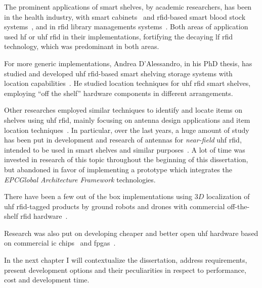 The prominent applications of smart shelves, by academic researchers, has been in the health industry, with smart cabinets~\cite{shiehUsingRFIDTechnology2008, dalessandroRFIDBasedSmartShelving2012, medeirosUHFRFIDCabinet2011, gomesIntelligentMedicineCabinet2013} and \ac{rfid}-based smart blood stock systems~\cite{zaricRFIDbasedSmartBlood2015}, and in \ac{rfid} library managements systems~\cite{markakisRFIDenabledLibraryManagement2013, markakisSafeEfficientDesign2014, ahmadtarmizibinabdullahLibraryShelfManagement2011, nishiyamaSmartShelfEfficient2012}.
Both areas of application used \acs{hf} or \acs{uhf} \ac{rfid} in their implementations, fortifying the decaying \ac{lf} \ac{rfid} technology, which was predominant in both areas.

For more generic implementations, Andrea D’Alessandro, in his PhD thesis, has studied and developed \ac{uhf} \ac{rfid}-based smart shelving storage systems with location capabilities~\cite{dalessandroRFIDBasedSmartShelving2012}.
He studied location techniques for \ac{uhf} \ac{rfid} smart shelves, employing ``off the shelf'' hardware components in different arrangements.

Other researches employed similar techniques to identify and locate items on shelves using \ac{uhf} \ac{rfid}, mainly focusing on antenna design applications and item location techniques~\cite{choiPassiveUHFRFIDBased2012, nikitinTheoryMeasurementBackscattering2007, medeirosUHFRFIDReader, yuanUHFRFIDShelf2012a}. 
In particular, over the last years, a huge amount of study has been put in development and research of antennas for \emph{near-field} \ac{uhf} \ac{rfid}, intended to be used in smart shelves and similar purposes~\cite{yuanUHFRFIDShelf2012a, liCIRCULARLYPOLARIZEDCOMPACT2013, casoModularAntennaUHF2014, ankangrenNovelDesignUHF2010, michelScalableModularAntenna2015, michelOverviewModularAntennas2016, michelDesignPerformanceAnalysis2012, parthibanLowcostScalableUHF2016, andrenkoNovelDesignUHF2013, choPlanarNearFieldRFID2011, tolinPolarizationReconfigurablePatch2019, parthibanScalableNearfieldFed2019, chenDesignSimulationUHF2018, choiUshapedSlotarrayAntenna2011, liUHFRFIDShelf2017, yuanUHFRFIDShelf2012, manziUseTransmissionLines2012, catarinucciImprovingItemlevelTracing2010, guDesignNearFieldRFID2019}.
A lot of time was invested in research of this topic throughout the beginning of this dissertation, but abandoned in favor of implementing a prototype which integrates the \emph{EPCGlobal Architecture Framework} technologies.

There have been a few out of the box implementations using $3D$ localization of \ac{uhf} \ac{rfid}-tagged products by ground robots and drones with commercial off-the-shelf \ac{rfid} hardware~\cite{tzitzisRealtime3DLocalization2020}.

Research was also put on developing cheaper and better open \ac{uhf} hardware based on commercial \ac{ic} chips~\cite{tangDesignUHFRFID2010a, leiDesignHandheldUHF2011, wangHardwareDesignImplementation2015} and \acp{fpga}~\cite{mirandaSistemasRFIDUHF2015}.

In the next chapter I will contextualize the dissertation, address requirements, present development options and their peculiarities in respect to performance, cost and development time.

\cleardoublepage
